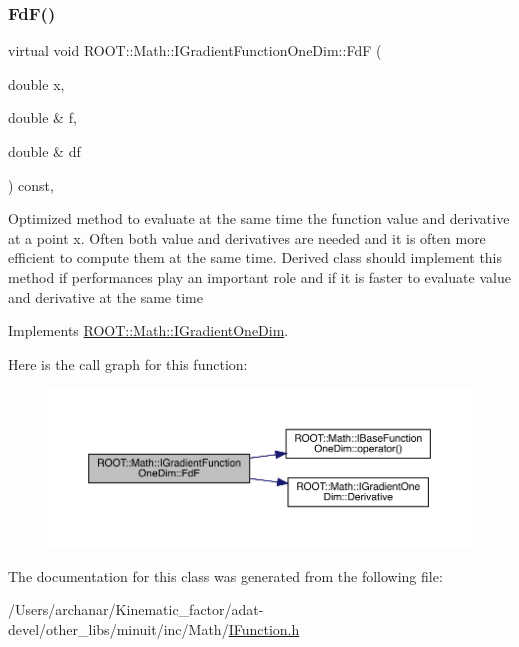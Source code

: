 \subsubsection{\texorpdfstring{FdF()}{FdF()}\hspace{0.1cm}{\footnotesize\ttfamily [3/3]}}
{\footnotesize\ttfamily virtual void R\+O\+O\+T\+::\+Math\+::\+I\+Gradient\+Function\+One\+Dim\+::\+FdF (\begin{DoxyParamCaption}\item[{double}]{x,  }\item[{double \&}]{f,  }\item[{double \&}]{df }\end{DoxyParamCaption}) const\hspace{0.3cm}{\ttfamily [inline]}, {\ttfamily [virtual]}}

Optimized method to evaluate at the same time the function value and derivative at a point x. Often both value and derivatives are needed and it is often more efficient to compute them at the same time. Derived class should implement this method if performances play an important role and if it is faster to evaluate value and derivative at the same time 

Implements \mbox{\hyperlink{classROOT_1_1Math_1_1IGradientOneDim_aef5560ea7d43e64d94bf875713e2a5fc}{R\+O\+O\+T\+::\+Math\+::\+I\+Gradient\+One\+Dim}}.

Here is the call graph for this function\+:
\nopagebreak
\begin{figure}[H]
\begin{center}
\leavevmode
\includegraphics[width=350pt]{d5/d75/classROOT_1_1Math_1_1IGradientFunctionOneDim_a01eaedb2ae1dfa5722f11281acf7a72b_cgraph}
\end{center}
\end{figure}


The documentation for this class was generated from the following file\+:\begin{DoxyCompactItemize}
\item 
/\+Users/archanar/\+Kinematic\+\_\+factor/adat-\/devel/other\+\_\+libs/minuit/inc/\+Math/\mbox{\hyperlink{adat-devel_2other__libs_2minuit_2inc_2Math_2IFunction_8h}{I\+Function.\+h}}\end{DoxyCompactItemize}
